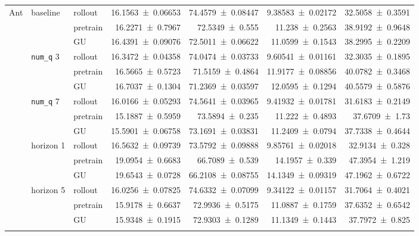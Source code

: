 {\begin{longtable}{@{}lllrrrr@{}}
    \addlinespace[2pt]
    \midrule
    Ant & baseline & rollout & \num{16.1563+-0.06653} & \num{74.4579+-0.08447} & \num{9.38583+-0.02172} & \num{32.5058+-0.3591} \\
     &  & pretrain & \num{16.2271+-0.7967} & \num{72.5349+-0.555} & \num{11.238+-0.2563} & \num{38.9192+-0.9648} \\
     &  & GU & \num{16.4391+-0.09076} & \num{72.5011+-0.06622} & \num{11.0599+-0.1543} & \num{38.2995+-0.2209} \\
    \addlinespace[2pt]
     & \texttt{num\_\allowbreak q} 3 & rollout & \num{16.3472+-0.04358} & \num{74.0474+-0.03733} & \num{9.60541+-0.01161} & \num{32.3035+-0.1895} \\
     &  & pretrain & \num{16.5665+-0.5723} & \num{71.5159+-0.4864} & \num{11.9177+-0.08856} & \num{40.0782+-0.3468} \\
     &  & GU & \num{16.7037+-0.1304} & \num{71.2369+-0.03597} & \num{12.0595+-0.1294} & \num{40.5579+-0.5876} \\
    \addlinespace[2pt]
     & \texttt{num\_\allowbreak q} 7 & rollout & \num{16.0166+-0.05293} & \num{74.5641+-0.03965} & \num{9.41932+-0.01781} & \num{31.6183+-0.2149} \\
     &  & pretrain & \num{15.1887+-0.5959} & \num{73.5894+-0.235} & \num{11.222+-0.4893} & \num{37.6709+-1.73} \\
     &  & GU & \num{15.5901+-0.06758} & \num{73.1691+-0.03831} & \num{11.2409+-0.0794} & \num{37.7338+-0.4644} \\
    \addlinespace[2pt]
     & horizon 1 & rollout & \num{16.5632+-0.09739} & \num{73.5792+-0.09888} & \num{9.85761+-0.02018} & \num{32.9134+-0.328} \\
     &  & pretrain & \num{19.0954+-0.6683} & \num{66.7089+-0.539} & \num{14.1957+-0.339} & \num{47.3954+-1.219} \\
     &  & GU & \num{19.6543+-0.0728} & \num{66.2108+-0.08755} & \num{14.1349+-0.09319} & \num{47.1962+-0.6722} \\
    \addlinespace[2pt]
     & horizon 5 & rollout & \num{16.0256+-0.07825} & \num{74.6332+-0.07099} & \num{9.34122+-0.01157} & \num{31.7064+-0.4021} \\
     &  & pretrain & \num{15.9178+-0.6637} & \num{72.9936+-0.5175} & \num{11.0887+-0.1759} & \num{37.6352+-0.6542} \\
     &  & GU & \num{15.9348+-0.1915} & \num{72.9303+-0.1289} & \num{11.1349+-0.1443} & \num{37.7972+-0.825} \\
    \addlinespace[2pt]
  \end{longtable}
}

